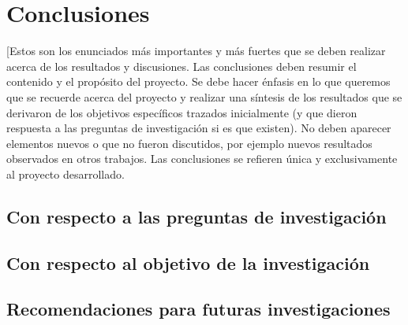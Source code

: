 \chapter{Conclusiones}\label{conclusiones}
[Estos son los enunciados más importantes y más fuertes que se deben realizar acerca de los resultados y discusiones. Las conclusiones deben resumir el contenido y el propósito del proyecto. Se debe hacer énfasis en lo que queremos que se recuerde acerca del proyecto y realizar una síntesis de los resultados que se derivaron de los objetivos específicos trazados inicialmente (y que dieron respuesta a las preguntas de investigación si es que existen). No deben aparecer elementos nuevos o que no fueron discutidos, por ejemplo nuevos resultados observados en otros trabajos. Las conclusiones se refieren única y exclusivamente al proyecto desarrollado.

\section{Con respecto a las preguntas de investigación}

\section{Con respecto al objetivo de la investigación}

\section{Recomendaciones para futuras investigaciones}


